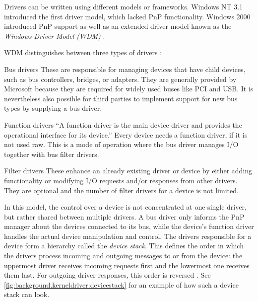 Drivers can be written using different models or frameworks. Windows NT 3.1 introduced the first driver model, which lacked PnP functionality. Windows 2000 introduced PnP support as well as an extended driver model known as the \emph{Windows Driver Model (WDM)} \cite{Yosifovich2017}.

WDM distinguishes between three types of drivers \cite{Yosifovich2017}:
\begin{descitemize}
	\item[Bus drivers] These are responsible for managing devices that have child devices, such as bus controllers, bridges, or adapters. They are generally provided by Microsoft because they are required for widely used buses like PCI and USB. It is nevertheless also possible for third parties to implement support for new bus types by supplying a bus driver.
	\item[Function drivers] ``A function driver is the main device driver and provides the operational interface for its device.'' \cite{Yosifovich2017} Every device needs a function driver, if it is not used raw. This is a mode of operation where the bus driver manages I/O together with bus filter drivers.
	\item[Filter drivers] These enhance an already existing driver or device by either adding functionality or modifying I/O requests and/or responses from other drivers. They are optional and the number of filter drivers for a device is not limited.
\end{descitemize}

In this model, the control over a device is not concentrated at one single driver, but rather shared between multiple drivers. A bus driver only informs the PnP manager about the devices connected to its bus, while the device's function driver handles the actual device manipulation and control. The drivers responsible for a device form a hierarchy called the \emph{device stack}. This defines the order in which the drivers process incoming and outgoing messages to or from the device: the uppermost driver receives incoming requests first and the lowermost one receives them last. For outgoing driver responses, this order is reversed \cite{Yosifovich2017}. See \autoref{fig:background.kerneldriver.devicestack} for an example of how such a device stack can look.

